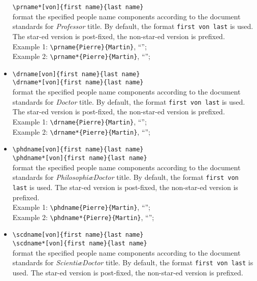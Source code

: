 \documentclass[book]{upmethodology-document}
\begin{document}
\begin{itemize}
      \texttt{{\textbackslash}prname*[von]\{first name\}\{last name\}} \\
	format the specified people name components according to the document standards for \emph{Professor} title. By default, the format \texttt{first von last} is used. The star-ed version is post-fixed, the non-star-ed version is prefixed. \\
	Example 1: \texttt{{\textbackslash}prname\{Pierre\}\{Martin\}}, ``''; \\
	Example 2: \texttt{{\textbackslash}prname*\{Pierre\}\{Martin\}}, ``'';
\item \texttt{{\textbackslash}drname[von]\{first name\}\{last name\}} \\
      \texttt{{\textbackslash}drname*[von]\{first name\}\{last name\}} \\
	format the specified people name components according to the document standards for \emph{Doctor} title. By default, the format \texttt{first von last} is used. The star-ed version is post-fixed, the non-star-ed version is prefixed. \\
	Example 1: \texttt{{\textbackslash}drname\{Pierre\}\{Martin\}}, ``''; \\
	Example 2: \texttt{{\textbackslash}drname*\{Pierre\}\{Martin\}}, ``'';
\item \texttt{{\textbackslash}phdname[von]\{first name\}\{last name\}} \\
      \texttt{{\textbackslash}phdname*[von]\{first name\}\{last name\}} \\
	format the specified people name components according to the document standards for \emph{Philosophi\ae Doctor} title. By default, the format \texttt{first von last} is used. The star-ed version is post-fixed, the non-star-ed version is prefixed. \\
	Example 1: \texttt{{\textbackslash}phdname\{Pierre\}\{Martin\}}, ``''; \\
	Example 2: \texttt{{\textbackslash}phdname*\{Pierre\}\{Martin\}}, ``'';
\item \texttt{{\textbackslash}scdname[von]\{first name\}\{last name\}} \\
      \texttt{{\textbackslash}scdname*[von]\{first name\}\{last name\}} \\
	format the specified people name components according to the document standards for \emph{Scienti\ae Doctor} title. By default, the format \texttt{first von last} is used. The star-ed version is post-fixed, the non-star-ed version is prefixed. \\

\end{itemize}
\end{document}

